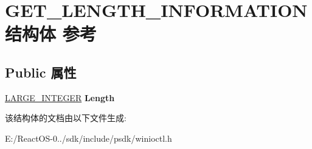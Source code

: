 \hypertarget{struct_g_e_t___l_e_n_g_t_h___i_n_f_o_r_m_a_t_i_o_n}{}\section{G\+E\+T\+\_\+\+L\+E\+N\+G\+T\+H\+\_\+\+I\+N\+F\+O\+R\+M\+A\+T\+I\+O\+N结构体 参考}
\label{struct_g_e_t___l_e_n_g_t_h___i_n_f_o_r_m_a_t_i_o_n}
\subsection*{Public 属性}
\begin{DoxyCompactItemize}
\item 
\mbox{\label{struct_g_e_t___l_e_n_g_t_h___i_n_f_o_r_m_a_t_i_o_n_aa11a5d965ae915ae6d3835394781736d}} 
\hyperlink{union___l_a_r_g_e___i_n_t_e_g_e_r}{L\+A\+R\+G\+E\+\_\+\+I\+N\+T\+E\+G\+ER} {\bfseries Length}
\end{DoxyCompactItemize}


该结构体的文档由以下文件生成\+:\begin{DoxyCompactItemize}
\item 
E\+:/\+React\+O\+S-\/0../sdk/include/psdk/winioctl.\+h\end{DoxyCompactItemize}
